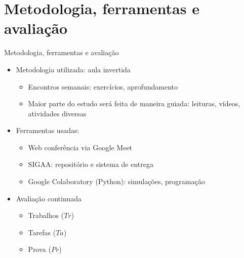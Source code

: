    \section[ slide = true]{Metodologia, ferramentas e avaliação}
      \begin{slide}[toc=]{Metodologia, ferramentas e avaliação}
         \begin{itemize}
	    \item Metodologia utilizada: aula invertida  
		    \begin{itemize}
			    \item Encontros semanais: exercícios, aprofundamento
			    \item Maior parte do estudo será feita de maneira guiada: leituras, vídeos, atividades diversas
		    \end{itemize}
	    \item Ferramentas usadas:
		    \begin{itemize}
			    \item Web conferência via Google Meet
			    \item SIGAA: repositório e sistema de entrega
			    \item Google Colaboratory (Python): simulações, programação 
		    \end{itemize}

            \item Avaliação continuada
            \begin{itemize}
		    \item Trabalhos ($Tr$) 
		    \item Tarefas ($Ta$)
		    \item Prova ($Pr$)
	    \end{itemize}
	  	 \end{itemize}
      \end{slide}
      

